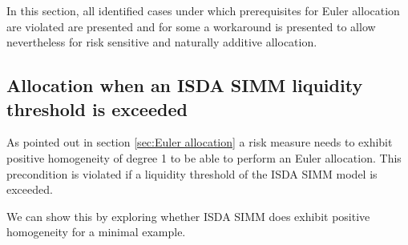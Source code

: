 \documentclass[../Thesis_AHoecherl.tex]{subfiles}
\begin{document}
    In this section, all identified cases under which prerequisites for Euler allocation are violated are presented and for some a workaround is presented to allow nevertheless for risk sensitive and naturally additive allocation.
    
    \subsection{Allocation when an ISDA SIMM liquidity threshold is exceeded\label{sec:Allocation when an ISDA-SIMM liquidity threshold is exceeded}}
    
    As pointed out in section \ref{sec:Euler allocation} a risk measure needs to exhibit positive homogeneity of degree 1 to be able to perform an Euler allocation.
    This precondition is violated if a liquidity threshold of the \gls{ISDA SIMM} model is exceeded.

    We can show this by exploring whether \gls{ISDA SIMM} does exhibit positive homogeneity for a minimal example.
    
\end{document}
